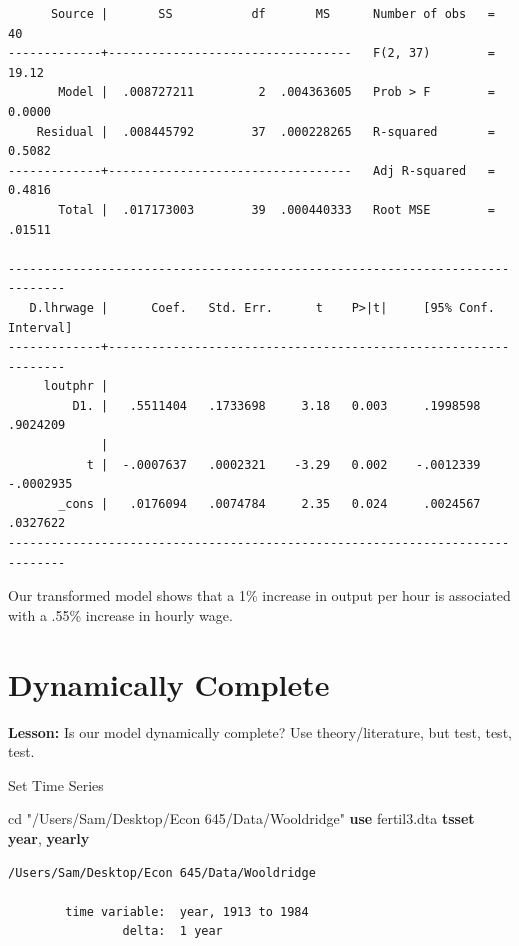\documentclass[
]{book}
\newenvironment{Shaded}{\begin{snugshade}}{\end{snugshade}}
\newcommand{\FunctionTok}[1]{\textcolor[rgb]{0.13,0.29,0.53}{\textbf{#1}}}
\newcommand{\KeywordTok}[1]{\textcolor[rgb]{0.13,0.29,0.53}{\textbf{#1}}}
\newcommand{\NormalTok}[1]{#1}
\newcommand{\StringTok}[1]{\textcolor[rgb]{0.31,0.60,0.02}{#1}}
\begin{document}
\begin{verbatim}
      Source |       SS           df       MS      Number of obs   =        40
-------------+----------------------------------   F(2, 37)        =     19.12
       Model |  .008727211         2  .004363605   Prob > F        =    0.0000
    Residual |  .008445792        37  .000228265   R-squared       =    0.5082
-------------+----------------------------------   Adj R-squared   =    0.4816
       Total |  .017173003        39  .000440333   Root MSE        =    .01511

------------------------------------------------------------------------------
   D.lhrwage |      Coef.   Std. Err.      t    P>|t|     [95% Conf. Interval]
-------------+----------------------------------------------------------------
     loutphr |
         D1. |   .5511404   .1733698     3.18   0.003     .1998598    .9024209
             |
           t |  -.0007637   .0002321    -3.29   0.002    -.0012339   -.0002935
       _cons |   .0176094   .0074784     2.35   0.024     .0024567    .0327622
------------------------------------------------------------------------------
\end{verbatim}

Our transformed model shows that a 1\% increase in output per hour is associated
with a .55\% increase in hourly wage.

\chapter{Dynamically Complete}\label{dynamically-complete}

\textbf{Lesson:} Is our model dynamically complete? Use theory/literature, but test, test, test.

Set Time Series

\begin{Shaded}
\begin{Highlighting}[]
\NormalTok{cd }\StringTok{"/Users/Sam/Desktop/Econ 645/Data/Wooldridge"}
\KeywordTok{use}\NormalTok{ fertil3.dta}
\KeywordTok{tsset} \FunctionTok{year}\NormalTok{, }\FunctionTok{yearly}
\end{Highlighting}
\end{Shaded}

\begin{verbatim}
/Users/Sam/Desktop/Econ 645/Data/Wooldridge

        time variable:  year, 1913 to 1984
                delta:  1 year
\end{verbatim}
\end{document}
